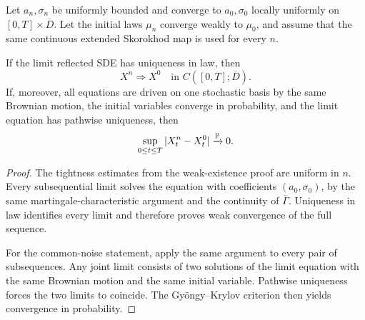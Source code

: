 \begin{theorem}
Let $a_n,\sigma_n$ be uniformly bounded and converge to $a_0,\sigma_0$
locally uniformly on $[0,T]\times\overline D$. Let the initial laws
$\mu_n$ converge weakly to $\mu_0$, and assume that the same continuous
extended Skorokhod map is used for every $n$.

If the limit reflected SDE has uniqueness in law, then
\[
  X^n\Longrightarrow X^0
  \quad\text{in }C([0,T];\overline D).
\]
If, moreover, all equations are driven on one stochastic basis by the same
Brownian motion, the initial variables converge in probability, and the
limit equation has pathwise uniqueness, then
\[
  \sup_{0\leq t\leq T}|X^n_t-X^0_t|\xrightarrow{\P}0.
\]
\end{theorem}

\begin{proof}
The tightness estimates from the weak-existence proof are uniform in $n$.
Every subsequential limit solves the equation with coefficients
$(a_0,\sigma_0)$, by the same martingale-characteristic argument and the
continuity of $\overline\Gamma$. Uniqueness in law identifies every limit and
therefore proves weak convergence of the full sequence.

For the common-noise statement, apply the same argument to every pair of
subsequences. Any joint limit consists of two solutions of the limit equation
with the same Brownian motion and the same initial variable. Pathwise
uniqueness forces the two limits to coincide. The Gy\"ongy--Krylov criterion
then yields convergence in probability.
\end{proof}
